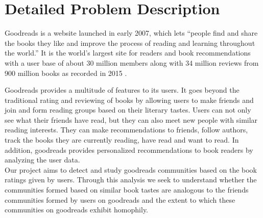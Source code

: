 \documentclass[11pt]{article}
\begin{document}
\maketitle

\section{Detailed Problem Description}
Goodreads is a website launched in early 2007, which lets ``people find and share the books they like and improve the process of reading and learning throughout the world.'' It is the world's largest site for readers and book recommendations with a user base of about 30 million members along with 34 million reviews from 900 million books as recorded in 2015 \cite{goodreads:aboutus}.

Goodreads provides a multitude of features to its users. It goes beyond the traditional rating and reviewing of books by allowing users to make friends and join and form reading groups based on their literary tastes.
Users can not only see what their friends have read, but they can also meet new people with similar reading interests. They can make recommendations to friends, follow authors, track the books they are currently reading, have read and want to read. In addition, goodreads provides personalized recommendations to book readers by analyzing the user data.\\

Our project aims  to detect and study goodreads communities based on the book ratings given by users. 
Through this analysis we seek to understand whether the communities formed based on similar book tastes are analogous to the friends communities formed by users on goodreads and the extent to which these communities on goodreads exhibit homophily.
\end{document}
